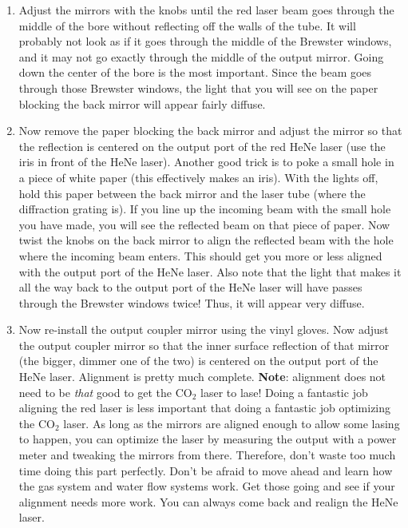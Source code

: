 \documentclass{../lab}
\begin{document}
\begin{enumerate}
\newpage

    \item Adjust the mirrors with the knobs until the red laser beam goes through the middle of the bore without reflecting off the walls of the tube. It will probably not look as if it goes through the middle of the Brewster windows, and it may not go exactly through the middle of the output mirror. Going down the center of the bore is the most important. Since the beam goes through those Brewster windows, the light that you will see on the paper blocking the back mirror will appear fairly diffuse.

    \item Now remove the paper blocking the back mirror and adjust the mirror so that the reflection is centered on the output port of the red HeNe laser (use the iris in front of the HeNe laser). Another good trick is to poke a small hole in a piece of white paper (this effectively makes an iris). With the lights off, hold this paper between the back mirror and the laser tube (where the diffraction grating is). If you line up the incoming beam with the small hole you have made, you will see the reflected beam on that piece of paper. Now twist the knobs on the back mirror to align the reflected beam with the hole where the incoming beam enters. This should get you more or less aligned with the output port of the HeNe laser. Also note that the light that makes it all the way back to the output port of the HeNe laser will have passes through the Brewster windows twice! Thus, it will appear very diffuse.
    
    

    \item Now re-install the output coupler mirror using the vinyl gloves. Now adjust the output coupler mirror so that the inner surface reflection of that mirror (the bigger, dimmer one of the two) is centered on the output port of the HeNe laser. Alignment is pretty much complete. \textbf{Note}: alignment does not need to be \emph{that} good to get the CO$_2$ laser to lase! Doing a fantastic job aligning the red laser is less important that doing a fantastic job optimizing the CO$_2$ laser. As long as the mirrors are aligned enough to allow some lasing to happen, you can optimize the laser by measuring the output with a power meter and tweaking the mirrors from there. Therefore, don't waste too much time doing this part perfectly. Don't be afraid to move ahead and learn how the gas system and water flow systems work. Get those going and see if your alignment needs more work. You can always come back and realign the HeNe laser.


\end{enumerate}
\end{document}

